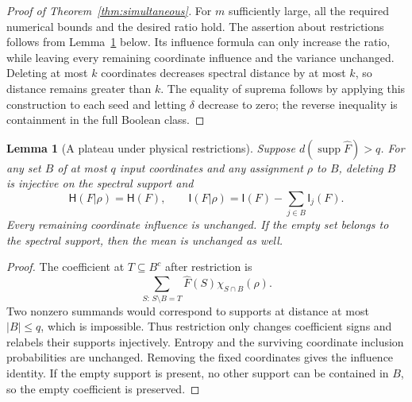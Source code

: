\documentclass[11pt]{amsart}
\newtheorem{lemma}[theorem]{Lemma}
\theoremstyle{definition}
\theoremstyle{remark}
\newcommand{\HH}{\mathsf H}
\newcommand{\I}{\mathsf I}
\newcommand{\wh}[1]{\widehat{#1}}
\newcommand{\supp}{\operatorname{supp}}
\begin{document}
\begin{proof}[Proof of Theorem~\ref{thm:simultaneous}]
For $m$ sufficiently large, all the required numerical bounds and the desired ratio hold. The assertion about restrictions follows from Lemma~\ref{lem:plateau} below. Its influence formula can only increase the ratio, while leaving every remaining coordinate influence and the variance unchanged. Deleting at most $k$ coordinates decreases spectral distance by at most $k$, so distance remains greater than $k$. The equality of suprema follows by applying this construction to each seed and letting $\delta$ decrease to zero; the reverse inequality is containment in the full Boolean class.
\end{proof}

\begin{lemma}[A plateau under physical restrictions]\label{lem:plateau}
Suppose $d(\supp\wh F)>q$. For any set $B$ of at most $q$ input coordinates and any assignment $\rho$ to $B$, deleting $B$ is injective on the spectral support and
\begin{equation}\label{eq:plateau}
 \HH(F|\rho)=\HH(F),\qquad
 \I(F|\rho)=\I(F)-\sum_{j\in B}\I_j(F).
\end{equation}
Every remaining coordinate influence is unchanged. If the empty set belongs to the spectral support, then the mean is unchanged as well.
\end{lemma}
\begin{proof}
The coefficient at $T\subseteq B^c$ after restriction is
\[
 \sum_{S:\,S\setminus B=T}\wh F(S)\chi_{S\cap B}(\rho).
\]
Two nonzero summands would correspond to supports at distance at most $|B|\le q$, which is impossible. Thus restriction only changes coefficient signs and relabels their supports injectively. Entropy and the surviving coordinate inclusion probabilities are unchanged. Removing the fixed coordinates gives the influence identity. If the empty support is present, no other support can be contained in $B$, so the empty coefficient is preserved.
\end{proof}
\end{document}
